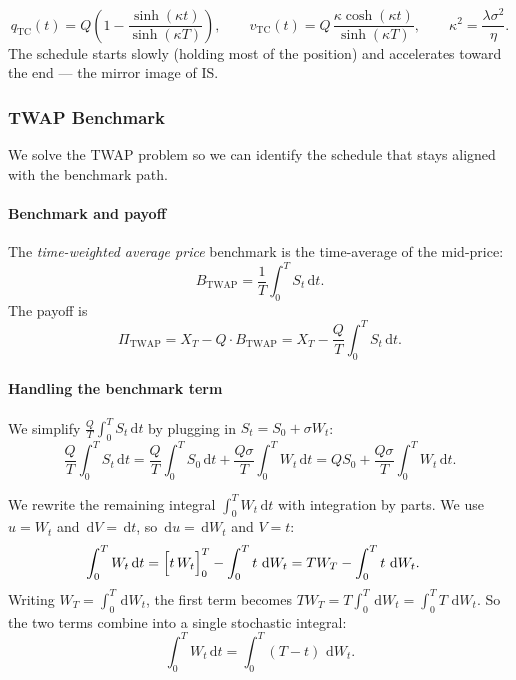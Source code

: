 \documentclass[12pt, a4paper]{article}
\newcommand{\dd}{\,\mathrm{d}}
\newcommand{\kap}{\kappa}
\begin{document}
\begin{resultbox}
\[
  q_{\mathrm{TC}}(t) = Q\!\left(1 - \frac{\sinh(\kap t)}{\sinh(\kap T)}\right),
  \qquad
  v_{\mathrm{TC}}(t) = Q\,\frac{\kap\cosh(\kap t)}{\sinh(\kap T)},
  \qquad \kap^2 = \frac{\lambda\sigma^2}{\eta}.
\]
The schedule starts slowly (holding most of the position)
and accelerates toward the end --- the mirror image of IS.
\end{resultbox}

\subsubsection{TWAP Benchmark}
\label{sec:TWAP}

We solve the TWAP problem so we can identify the schedule that stays aligned with the benchmark path.

\paragraph{Benchmark and payoff}

The \emph{time-weighted average price} benchmark is the time-average of the mid-price:
\[
  B_{\mathrm{TWAP}} = \frac{1}{T}\int_0^T S_t \dd t.
\]
The payoff is
\[
  \Pi_{\mathrm{TWAP}} = X_T - Q \cdot B_{\mathrm{TWAP}}
  = X_T - \frac{Q}{T}\int_0^T S_t \dd t.
\]

\paragraph{Handling the benchmark term}

We simplify $\frac{Q}{T}\int_0^T S_t \dd t$ by plugging in $S_t = S_0 + \sigma W_t$:
\[
  \frac{Q}{T}\int_0^T S_t \dd t
  = \frac{Q}{T}\!\int_0^T S_0 \dd t + \frac{Q\sigma}{T}\!\int_0^T W_t \dd t
  = QS_0 + \frac{Q\sigma}{T}\!\int_0^T W_t \dd t.
\]

We rewrite the remaining integral $\int_0^T W_t \dd t$ with integration by parts.
We use $u = W_t$ and $\dd V = \dd t$, so $\dd u = \dd W_t$ and $V = t$:
\begin{align}
  \int_0^T W_t \dd t
  &= \Bigl[t\, W_t\Bigr]_0^T - \int_0^T t\, \dd W_t
   = T W_T - \int_0^T t\, \dd W_t.
   \label{eq:ibp-twap}
\end{align}
Writing $W_T = \int_0^T \dd W_t$, the first term becomes
$T W_T = T\int_0^T \dd W_t = \int_0^T T\,\dd W_t$.
So the two terms combine into a single stochastic integral:
\[
  \int_0^T W_t \dd t
  = \int_0^T (T - t)\,\dd W_t.
\]
\end{document}
